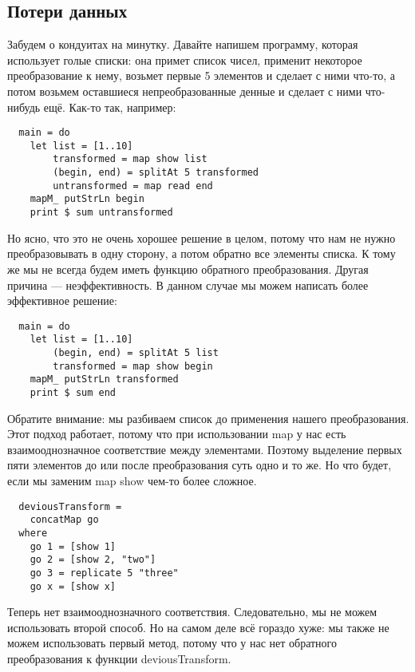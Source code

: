 \subsection{Потери данных}
 
Забудем о кондуитах на минутку. Давайте напишем программу, которая использует голые списки: она примет список чисел, применит некоторое преобразование к нему, возьмет первые 5 элементов и сделает с ними что-то, а потом возьмем оставшиеся непреобразованные денные и сделает с ними что-нибудь ещё. Как-то так, например:
\begin{lstlisting}
  main = do
    let list = [1..10]
        transformed = map show list
        (begin, end) = splitAt 5 transformed
        untransformed = map read end
    mapM_ putStrLn begin
    print $ sum untransformed
\end{lstlisting}
Но ясно, что это не очень хорошее решение в целом, потому что нам не нужно преобразовывать в одну сторону, а потом обратно все элементы списка. К тому же мы не всегда будем иметь функцию обратного преобразования. Другая причина --- неэффективность. В данном случае мы можем написать более эффективное решение:
\begin{lstlisting}
  main = do
    let list = [1..10]
        (begin, end) = splitAt 5 list
        transformed = map show begin
    mapM_ putStrLn transformed
    print $ sum end
\end{lstlisting}
Обратите внимание: мы разбиваем список до применения  нашего преобразования. Этот подход работает, потому что при использовании map у нас есть взаимооднозначное соответствие между элементами. Поэтому выделение первых пяти элементов до или после преобразования суть одно и то же. Но что будет, если мы заменим map show чем-то более сложное.
\begin{lstlisting}
  deviousTransform =
    concatMap go
  where
    go 1 = [show 1]
    go 2 = [show 2, "two"]
    go 3 = replicate 5 "three"
    go x = [show x]
\end{lstlisting}
Теперь нет взаимооднозначного соответствия. Следовательно, мы не можем использовать второй способ. Но на самом деле всё гораздо хуже: мы также не можем использовать первый метод, потому что у нас нет обратного преобразования к функции deviousTransform.
 
